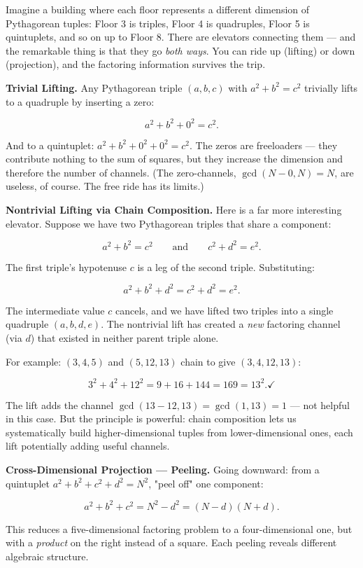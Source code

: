 Imagine a building where each floor represents a different dimension of Pythagorean tuples: Floor 3 is triples, Floor 4 is quadruples, Floor 5 is quintuplets, and so on up to Floor 8. There are elevators connecting them --- and the remarkable thing is that they go \textit{both ways}. You can ride up (lifting) or down (projection), and the factoring information survives the trip.

\textbf{Trivial Lifting.} Any Pythagorean triple $(a, b, c)$ with $a^2 + b^2 = c^2$ trivially lifts to a quadruple by inserting a zero:

\[
a^2 + b^2 + 0^2 = c^2.
\]

And to a quintuplet: $a^2 + b^2 + 0^2 + 0^2 = c^2$. The zeros are freeloaders --- they contribute nothing to the sum of squares, but they increase the dimension and therefore the number of channels. (The zero-channels, $\gcd(N - 0, N) = N$, are useless, of course. The free ride has its limits.)

\textbf{Nontrivial Lifting via Chain Composition.} Here is a far more interesting elevator. Suppose we have two Pythagorean triples that share a component:

\[
a^2 + b^2 = c^2 \qquad \text{and} \qquad c^2 + d^2 = e^2.
\]

The first triple's hypotenuse $c$ is a leg of the second triple. Substituting:

\[
a^2 + b^2 + d^2 = c^2 + d^2 = e^2.
\]

The intermediate value $c$ cancels, and we have lifted two triples into a single quadruple $(a, b, d, e)$. The nontrivial lift has created a \textit{new} factoring channel (via $d$) that existed in neither parent triple alone.

For example: $(3, 4, 5)$ and $(5, 12, 13)$ chain to give $(3, 4, 12, 13)$:

\[
3^2 + 4^2 + 12^2 = 9 + 16 + 144 = 169 = 13^2. \checkmark
\]

The lift adds the channel $\gcd(13 - 12, 13) = \gcd(1, 13) = 1$ --- not helpful in this case. But the principle is powerful: chain composition lets us systematically build higher-dimensional tuples from lower-dimensional ones, each lift potentially adding useful channels.

\textbf{Cross-Dimensional Projection --- Peeling.} Going downward: from a quintuplet $a^2 + b^2 + c^2 + d^2 = N^2$, "peel off" one component:

\[
a^2 + b^2 + c^2 = N^2 - d^2 = (N - d)(N + d).
\]

This reduces a five-dimensional factoring problem to a four-dimensional one, but with a \textit{product} on the right instead of a square. Each peeling reveals different algebraic structure.

